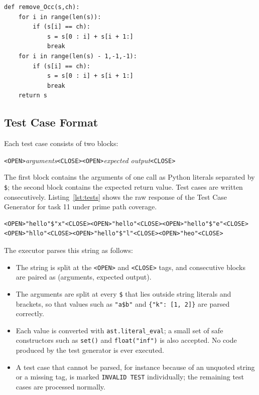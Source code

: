 \documentclass[11pt, a4paper]{article}
\begin{document}
\begin{lstlisting}[style=python, caption={MBPP reference solution for task 11 (\texttt{reference\_code.py})}, label={lst:refcode}]
def remove_Occ(s,ch):
    for i in range(len(s)):
        if (s[i] == ch):
            s = s[0 : i] + s[i + 1:]
            break
    for i in range(len(s) - 1,-1,-1):
        if (s[i] == ch):
            s = s[0 : i] + s[i + 1:]
            break
    return s
\end{lstlisting}

\subsection{Test Case Format}

Each test case consists of two blocks:
\begin{center}
\texttt{<OPEN>}\textit{arguments}\texttt{<CLOSE><OPEN>}\textit{expected output}\texttt{<CLOSE>}
\end{center}
The first block contains the arguments of one call as Python literals separated by \texttt{\$}; the second block contains the expected return value. Test cases are written consecutively. Listing~\ref{lst:tests} shows the raw response of the Test Case Generator for task 11 under prime path coverage.

\begin{lstlisting}[style=text, caption={Generated test cases for task 11 (\texttt{test\_cases.txt})}, label={lst:tests}]
<OPEN>"hello"$"x"<CLOSE><OPEN>"hello"<CLOSE><OPEN>"hello"$"e"<CLOSE><OPEN>"hllo"<CLOSE><OPEN>"hello"$"l"<CLOSE><OPEN>"heo"<CLOSE>
\end{lstlisting}

The executor parses this string as follows:
\begin{itemize}
    \item The string is split at the \texttt{<OPEN>} and \texttt{<CLOSE>} tags, and consecutive blocks are paired as (arguments, expected output).
    \item The arguments are split at every \texttt{\$} that lies outside string literals and brackets, so that values such as \texttt{"a\$b"} and \texttt{\{"k": [1, 2]\}} are parsed correctly.
    \item Each value is converted with \texttt{ast.literal\_eval}; a small set of safe constructors such as \texttt{set()} and \texttt{float("inf")} is also accepted. No code produced by the test generator is ever executed.
    \item A test case that cannot be parsed, for instance because of an unquoted string or a missing tag, is marked \texttt{INVALID TEST} individually; the remaining test cases are processed normally.
\end{itemize}
\end{document}
